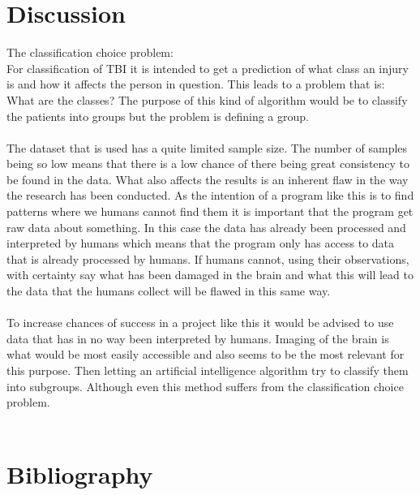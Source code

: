 \documentclass[11pt]{article}
\begin{document}
\section{Discussion}
The classification choice problem:\\
For classification of TBI it is intended to get a prediction of what class an injury is and how it affects the person in question. This leads to a problem that is: What are the classes? The purpose of this kind of algorithm would be to classify the patients into groups but the problem is defining a group.\\
\\
The dataset that is used has a quite limited sample size. The number of samples being so low means that there is a low chance of there being great consistency to be found in the data. What also affects the results is an inherent flaw in the way the research has been conducted. As the intention of a program like this is to find patterns where we humans cannot find them it is important that the program get raw data about something. In this case the data has already been processed and interpreted by humans which means that the program only has access to data that is already processed by humans. If humans cannot, using their observations, with certainty say what has been damaged in the brain and what this will lead to the data that the humans collect will be flawed in this same way.\\
\\
To increase chances of success in a project like this it would be advised to use data that has in no way been interpreted by humans. Imaging of the brain is what would be most easily accessible and also seems to be the most relevant for this purpose. Then letting an artificial intelligence algorithm try to classify them into subgroups. Although even this method suffers from the classification choice problem.\\
\\

\section{Bibliography}

\printbibliography
\end{document}
